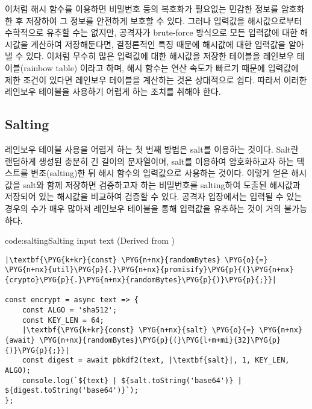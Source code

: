 이처럼 해시 함수를 이용하면 비밀번호 등의 복호화가 필요없는 민감한 정보를 암호화한 후 저장하여 그 정보를 안전하게 보호할 수 있다. 그러나 입력값을 해시값으로부터 수학적으로 유추할 수는 없지만, 공격자가 brute-force 방식으로 모든 입력값에 대한 해시값을 계산하여 저장해둔다면, 결정론적인 특징 때문에 해시값에 대한 입력값을 알아낼 수 있다. 이처럼 무수히 많은 입력값에 대한 해시값을 저장한 테이블을 레인보우 테이블(rainbow table) 이라고 하며, 해시 함수는 연산 속도가 빠르기 때문에 입력값에 제한 조건이 있다면 레인보우 테이블을 계산하는 것은 상대적으로 쉽다. 따라서 이러한 레인보우 테이블을 사용하기 어렵게 하는 조치를 취해야 한다.

\subsection*{Salting}

레인보우 테이블 사용을 어렵게 하는 첫 번째 방법은 salt를 이용하는 것이다. Salt란 랜덤하게 생성된 충분히 긴 길이의 문자열이며, salt를 이용하여 암호화하고자 하는 텍스트를 변조(salting)한 뒤 해시 함수의 입력값으로 사용하는 것이다. 이렇게 얻은 해시값을 salt와 함께 저장하면 검증하고자 하는 비밀번호를 salting하여 도출된 해시값과 저장되어 있는 해시값을 비교하여 검증할 수 있다. 공격자 입장에서는 입력될 수 있는 경우의 수가 매우 많아져 레인보우 테이블을 통해 입력값을 유추하는 것이 거의 불가능하다.

\begin{code}{code:salting}{Salting input text (Derived from )}
\begin{verbatim}
|\textbf{\PYG{k+kr}{const} \PYG{n+nx}{randomBytes} \PYG{o}{=} \PYG{n+nx}{util}\PYG{p}{.}\PYG{n+nx}{promisify}\PYG{p}{(}\PYG{n+nx}{crypto}\PYG{p}{.}\PYG{n+nx}{randomBytes}\PYG{p}{)}\PYG{p}{;}}|

const encrypt = async text => {
    const ALGO = 'sha512';
    const KEY_LEN = 64;
    |\textbf{\PYG{k+kr}{const} \PYG{n+nx}{salt} \PYG{o}{=} \PYG{n+nx}{await} \PYG{n+nx}{randomBytes}\PYG{p}{(}\PYG{l+m+mi}{32}\PYG{p}{)}\PYG{p}{;}}|
    const digest = await pbkdf2(text, |\textbf{salt}|, 1, KEY_LEN, ALGO);
    console.log(`${text} | ${salt.toString('base64')} | ${digest.toString('base64')}`);
};
\end{verbatim}
\end{code}



